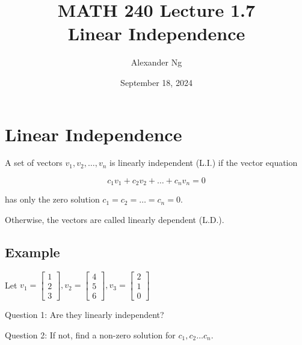 \documentclass[12pt]{article}
\begin{document}
\title{MATH 240 Lecture 1.7\\Linear Independence}
\author{Alexander Ng}
\date{September 18, 2024}

\maketitle

\section{Linear Independence}

A set of vectors {$v_{1}, v_{2}, \dots, v_{n}$} is linearly independent (L.I.)
if the vector equation

\begin{equation*}
  c_1 v_1 + c_2 v_2 + \dots + c_n v_n = 0
\end{equation*}

has only the zero solution $c_1=c_2=\dots=c_n=0$.

Otherwise, the vectors are called linearly dependent (L.D.).

\subsection{Example}

Let $v_1 = \begin{bmatrix} 1 \\ 2 \\ 3 \end{bmatrix}, 
v_2 = \begin{bmatrix} 4 \\ 5 \\ 6 \end{bmatrix},
v_3 = \begin{bmatrix} 2 \\ 1 \\ 0 \end{bmatrix}$

Question 1: Are they linearly independent?

Question 2: If not, find a non-zero solution for $c_1, c_2 \dots c_n$.
\end{document}
